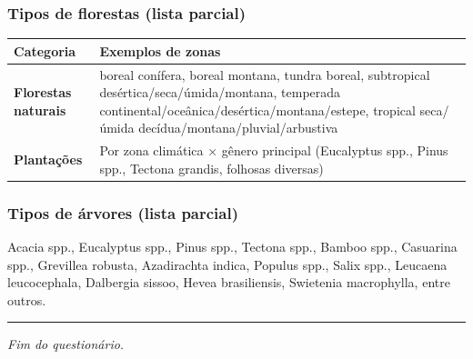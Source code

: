 \subsubsection{Tipos de florestas (lista parcial)}\label{tipos-de-florestas-lista-parcial}

{
\begin{longtable}[]{@{}
  >{\raggedright\arraybackslash}p{}
  >{\raggedright\arraybackslash}p{}@{}}
\toprule\noalign{}
\begin{minipage}[b]{\linewidth}\raggedright
Categoria
\end{minipage} & \begin{minipage}[b]{\linewidth}\raggedright
Exemplos de zonas
\end{minipage} \\
\midrule\noalign{}
\endhead
\bottomrule\noalign{}
\endlastfoot
\textbf{Florestas naturais} & boreal conífera, boreal montana, tundra boreal, subtropical desértica/seca/úmida/montana, temperada continental/oceânica/desértica/montana/estepe, tropical seca/úmida decídua/montana/pluvial/arbustiva \\
\textbf{Plantações} & Por zona climática × gênero principal (Eucalyptus spp., Pinus spp., Tectona grandis, folhosas diversas) \\
\end{longtable}
}

\subsubsection{Tipos de árvores (lista parcial)}\label{tipos-de-uxe1rvores-lista-parcial}

Acacia spp., Eucalyptus spp., Pinus spp., Tectona spp., Bamboo spp., Casuarina spp., Grevillea robusta, Azadirachta indica, Populus spp., Salix spp., Leucaena leucocephala, Dalbergia sissoo, Hevea brasiliensis, Swietenia macrophylla, entre outros.

\begin{center}\rule{0.5\linewidth}{0.5pt}\end{center}

\emph{Fim do questionário.}
